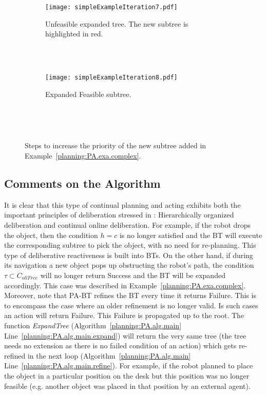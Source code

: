 \begin{figure}[h!]
        \centering
        \begin{subfigure}[b]{0.5\columnwidth}
                \centering
\texttt{[image: simpleExampleIteration7.pdf]}
                \caption{Unfeasible expanded tree. The new subtree is highlighted in red.}
                \label{planning:PA.fig.it7}
        \end{subfigure}\\
       ~ %
        \begin{subfigure}[b]{1\columnwidth}
                \centering
\texttt{[image: simpleExampleIteration8.pdf]}
                \caption{Expanded Feasible subtree.}
                \label{planning:PA.fig.it8}              
        \end{subfigure}
        ~ %
        \caption{Steps to increase the priority of the new subtree added in Example~\ref{planning:PA.exa.complex}.}
        ~ %
\end{figure}

\subsection{Comments on the Algorithm}

It is clear that this type of continual planning and acting exhibits both the important principles of deliberation stressed in \cite{ghallab2016automated, Ghallab14}: Hierarchically organized deliberation and continual online deliberation. For example, if the robot drops the object, then the condition $h = c$ is no longer satisfied and the BT will execute the corresponding subtree to pick the object, with no need for re-planning. This type of deliberative reactiveness is built into BTs.  On the other hand, if during its navigation a new object pops up obstructing the robot's path, the condition $\tau \subset C_{ollFree}$  will no longer return Success and the BT will be expanded accordingly. This case was  described  in Example~\ref{planning:PA.exa.complex}. Moreover, note that PA-BT refines the BT every time it returns Failure. This is to encompass the case where an older refinement is no longer valid. Is such cases an action will return Failure. This Failure is propagated up to the root. The function \emph{ExpandTree} (Algorithm~\ref{planning:PA.alg.main} Line~\ref{planning:PA.alg.main.expand}) will return the very same tree (the tree needs no extension as there is no failed condition of an action) which gets re-refined in the next loop (Algorithm~\ref{planning:PA.alg.main} Line~\ref{planning:PA.alg.main.refine}). For example, if the robot planned to place the object in a particular position on the desk but  this position was no longer feasible (e.g. another object was placed in that position by an external agent). 




